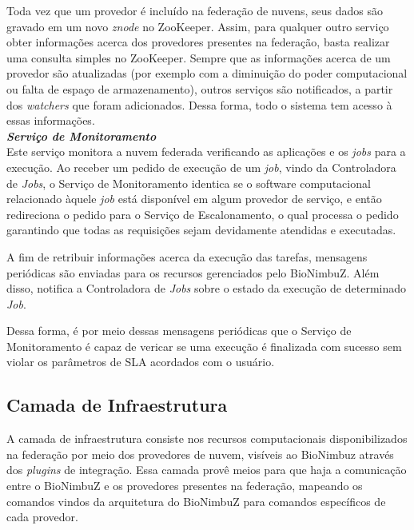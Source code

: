 Toda vez que um provedor é incluído na federação de nuvens, seus dados são gravado em um novo \textit{znode} no ZooKeeper. Assim, para qualquer outro serviço obter informações acerca dos provedores presentes na federação, basta realizar uma consulta simples no ZooKeeper. Sempre que as informações acerca de um provedor são atualizadas (por exemplo com a diminuição do poder computacional ou falta de espaço de armazenamento), outros serviços são notificados, a partir dos \textit{watchers} que foram adicionados. Dessa forma, todo o sistema tem acesso à essas informações.\\ 

\noindent
\textbf{\textit{Serviço de Monitoramento}} \\

\noindent
Este serviço monitora a nuvem federada verificando as aplicações e os \textit{jobs} para a execução. Ao receber um pedido de execução de um \textit{job}, vindo da Controladora de \textit{Jobs}, o Serviço de Monitoramento identica se o software computacional relacionado àquele \textit{job} está disponível em algum provedor de serviço, e então redireciona o pedido para o Serviço de Escalonamento, o qual processa o pedido garantindo que todas as requisições sejam devidamente atendidas e executadas. 

A fim de retribuir informações acerca da execução das tarefas, mensagens periódicas são enviadas para os recursos gerenciados pelo BioNimbuZ. Além disso, notifica a Controladora de \textit{Jobs} sobre o estado da execução de determinado \textit{Job}.

Dessa forma, é por meio dessas mensagens periódicas que o Serviço de Monitoramento é capaz de vericar se uma execução é finalizada com sucesso sem violar os parâmetros de SLA acordados com o usuário.

\noindent
\subsection{Camada de Infraestrutura} \label{cap4sec2subsec3}
 
A camada de infraestrutura consiste nos recursos computacionais disponibilizados na federação por meio dos provedores de nuvem, visíveis ao BioNimbuz através dos \textit{plugins} de integração. Essa camada provê meios para que haja a comunicação entre o BioNimbuZ e os provedores presentes na federação, mapeando os comandos vindos da arquitetura do BioNimbuZ para comandos específicos de cada provedor.

 

	



